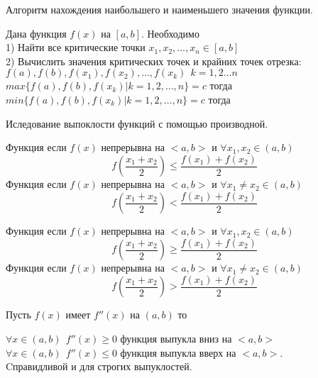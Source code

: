 \begin{title}[\Large]
  Алгоритм нахождения наибольшего и наименьшего значения функции.
\end{title}
Дана функция $f(x)$ на $[a,b]$. Необходимо\\
1) Найти все критические точки $x_1, x_2, \ldots, x_n \in [a, b]$\\
2) Вычислить значения критических точек и крайних точек отрезка:\\
$f(a), f(b), f(x_1), f(x_2), \ldots, f(x_k) ~~ k = 1, 2 \ldots n$\\
$max \{f(a), f(b), f(x_k) | k = 1, 2, \ldots, n\} = c $ тогда \\
$min \{f(a), f(b), f(x_k) | k = 1, 2, \ldots, n\} = c $ тогда 

\begin{title}[\Large]
  Иследование выпоклости функций с помощью производной.
\end{title}

\begin{defin}
  Функция  если $f(x)$ непрерывна на $<a,b>$ и
  $\forall x_1, x_2 \in (a,b)$
  \[f(\frac{x_1 + x_2}{2}) \le \frac{f(x_1) + f(x_2)}{2}\]
  Функция  если $f(x)$ непрерывна
  на $<a,b>$ и
  $\forall x_1 \not= x_2 \in (a,b)$
  \[f(\frac{x_1 + x_2}{2}) < \frac{f(x_1) + f(x_2)}{2}\]
\end{defin}

\begin{defin}
  Функция  если $f(x)$ непрерывна на $<a,b>$ и
  $\forall x_1, x_2 \in (a,b)$
  \[f(\frac{x_1 + x_2}{2}) \ge \frac{f(x_1) + f(x_2)}{2}\]
  Функция  если $f(x)$ непрерывна
  на $<a,b>$ и
  $\forall x_1 \not= x_2 \in (a,b)$
  \[f(\frac{x_1 + x_2}{2}) > \frac{f(x_1) + f(x_2)}{2}\]
\end{defin}

\begin{theorem}
  Пусть $f(x)$ имеет $f''(x)$ на $(a,b)$ то

  $\forall x \in (a,b) ~~ f''(x) \ge 0$ функция выпукла вниз на $<a,b>$\\
  $\forall x \in (a,b) ~~ f''(x) \le 0$ функция выпукла вверх на $<a,b>$.\\
  Cправидливой и для строгих выпуклостей.
\end{theorem}

